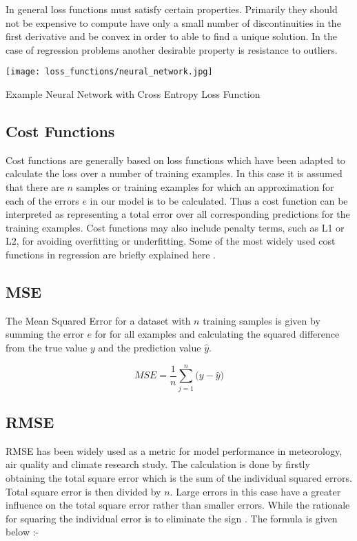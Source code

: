 In general loss functions must satisfy certain properties. Primarily they should not be expensive to compute \citep {Scholkopf:2001:LKS:559923} have only a small number of discontinuities in the first derivative and be convex in order to able to find a unique solution. In the case of regression problems another desirable property is resistance to outliers.

\begin{marginfigure}%
	\texttt{[image: loss\_functions/neural\_network.jpg]}
	\caption{Example Neural Network with Cross Entropy Loss Function}
	\label{fig:neural}
\end{marginfigure}

\subsection {Cost Functions}
Cost functions are generally based on loss functions which have been adapted to calculate the loss over a number of training examples. In this case it is assumed that there are $n$  samples or training examples for which an approximation for each of the errors $e$ in our model is to be calculated. Thus a cost function can be interpreted as representing a total error over all corresponding predictions for the training examples. Cost functions may also include  penalty terms, such as L1 or L2, for avoiding overfitting or underfitting. Some of the most widely used cost functions in regression are briefly explained here \citep {chai2014root}.
\subsection{MSE}
The Mean Squared Error for a dataset with $n$ training samples is given by summing the error $e$ for for all examples and calculating the squared difference from the true value $y$ and the prediction value $\hat{y}$.

\begin{equation}
MSE = {\frac{1}{n}\sum_{j=1}^{n}(y-\hat{y}})
\end{equation}

\subsection{RMSE}
RMSE has been widely used as a metric for model performance in meteorology, air quality and climate research study. The calculation is done by firstly obtaining the total square error which is the sum of the individual squared errors. Total square error is then divided by $n$. Large errors in this case have a greater influence on the total square error rather than smaller errors. While the rationale for squaring the individual error is to eliminate the sign \citep {willmott2005advantages}.
The formula is given below :-

